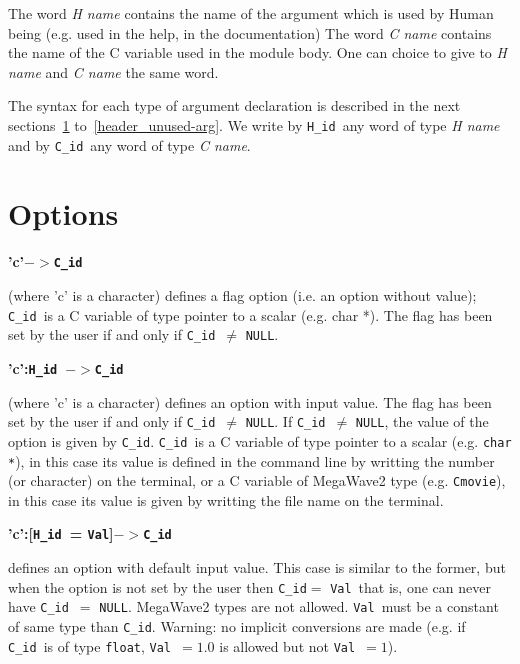 The word {\em H name} contains the name of the argument which is
used by Human being (e.g. used in the help, in the documentation)
The word {\em C name} contains the name of the C variable used 
in the module body.
One can choice to give to  {\em H name}  and  {\em C name} the same word.
 

\def\Tid{{\tt H\_id}}
\def\Cid{{\tt C\_id}}
\def\ACid{{\tt *C\_id}}
\def\Val{{\tt Val}}
\def\Min{{\tt Min}}
\def\Max{{\tt Max}}

\def\Liste#1{ \bigskip 
                {\bf #1 } 
              \par
            }

\def\Rarrow{$-\!>$}
\def\Larrow{$<\!-$}
\def\ENULL{$=$ {\tt NULL}}
\def\DNULL{$\not =$ {\tt NULL}}

The syntax for each type of argument declaration is described in the 
next sections~\ref{header_options} to~\ref{header_unused-arg}.
We write by \Tid\ any word of type {\em H name} and by
\Cid\ any word of type {\em C name}.

\section{Options}
\label{header_options}

\Liste{'c'\Rarrow\Cid} (where 'c' is a character) defines a flag option (i.e. an option without value); \Cid\ is a C variable of type pointer to a scalar (e.g. char *). 
The flag has been set by the user if and only if \Cid\ \DNULL.

\Liste{'c':\Tid\  \Rarrow \Cid} (where 'c' is a character) defines an option with input value.
The flag has been set by the user if and only if \Cid\ \DNULL.
If \Cid\ \DNULL, the value of the option is given by \ACid.
\Cid\ is a C variable of type pointer to a scalar (e.g. \verb+char *+),
in this case its value is defined in the command line by writting the
number (or character) on the terminal,
or a C variable of MegaWave2 type (e.g. \verb+Cmovie+),
in this case its value is given by writting the file name on the terminal.

\Liste{'c':[\Tid\  = \Val]\Rarrow \Cid}
defines an option with default input value.
This case is similar to the former, but when the option is not set by the user
then \ACid $=$ \Val\ that is, one can never have \Cid\ \ENULL.
MegaWave2 types are not allowed.
\Val\ must be a constant of same type than \Cid.
Warning: no implicit conversions are made (e.g. if \Cid\ is of type \verb+float+, \Val\ $=1.0$ is allowed but not \Val\ $=1$).

